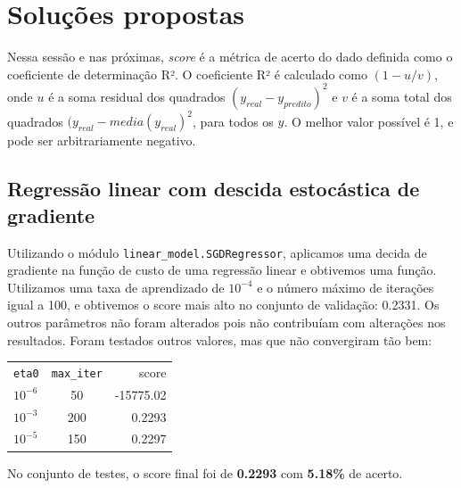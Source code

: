 \documentclass[conference]{IEEEtran}
\begin{document}
\section{Soluções propostas}
Nessa sessão e nas próximas, \textit{score} é a métrica de acerto do dado definida como o coeficiente de determinação R². O coeficiente R² é calculado como $(1 - u/v)$, onde $u$ é a soma residual dos quadrados $(y_{real} - y_{predito})^2$ e $v$ é a soma total dos quadrados $(y_{real} - media(y_{real})^2$, para todos os $y$. O melhor valor possível é 1, e pode ser arbitrariamente negativo.\cite{b4}

\subsection{Regressão linear com descida estocástica de gradiente}
Utilizando o módulo \texttt{linear\_model.SGDRegressor}, aplicamos uma decida de gradiente na função de custo de uma regressão linear e obtivemos uma função. Utilizamos uma taxa de aprendizado de  $10^{-4}$ e o número máximo de iterações igual a 100, e obtivemos o score mais alto no conjunto de validação: 0.2331. Os outros parâmetros não foram alterados pois não contribuíam com alterações nos resultados. Foram testados outros valores, mas que não convergiram tão bem:
\begin{center}

\begin{tabular}{ l c r }
  \texttt{eta0} & \texttt{max\_iter} & score \\
  $10^{-6}$ & 50 & -15775.02 \\
  $10^{-3}$ & 200 & 0.2293 \\
  $10^{-5}$ & 150 & 0.2297 \\
\end{tabular}

\end{center}

No conjunto de testes, o score final foi de \textbf{0.2293} com \textbf{5.18\%} de acerto.\\
\end{document}
